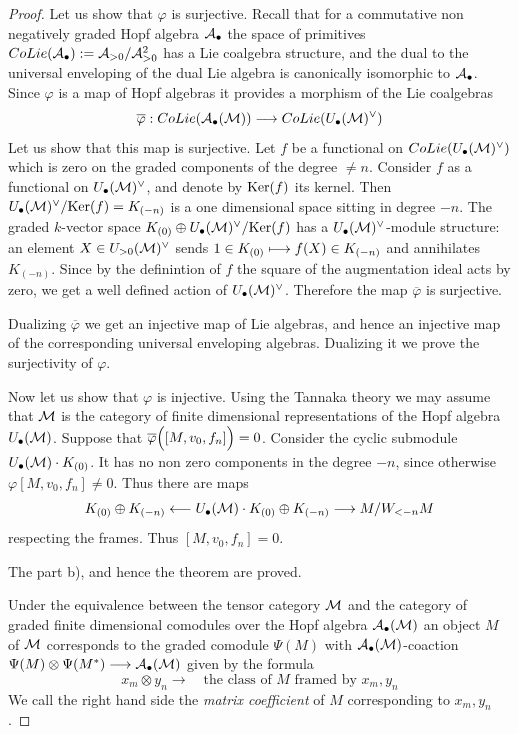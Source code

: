 \documentclass[10pt]{article}
\begin{document}
\begin{proof}
Let us show that $\varphi$ is surjective. Recall that for a commutative non negatively graded 
Hopf algebra ${\cal A}_{\bullet}$ the space of primitives 
$
{ CoLie} ({\cal A}_{\bullet}):= 
{\cal A}_{>0}/{\cal A}_{>0}^2
$ 
has a Lie coalgebra structure, and the dual to the 
universal enveloping of the dual Lie algebra is 
canonically isomorphic to  ${\cal A}_{\bullet}$. 
Since $\varphi$ is a map of Hopf algebras it provides a morphism of the Lie coalgebras 
$$
\overline \varphi: {CoLie} ({\cal A}_{\bullet}({\cal M})) \longrightarrow 
{CoLie} (U_{\bullet}({\cal M})^{\vee})
$$
Let us show that this map is surjective. 
Let $f$ be a functional on ${CoLie} (U_{\bullet}({\cal M})^{\vee})$ which is zero 
on the graded components of the degree $\not = n$. Consider $f$ as a functional 
on $U_{\bullet}({\cal M})^{\vee}$, and denote by ${\rm Ker}(f)$ its kernel. 
Then $U_{\bullet}({\cal M})^{\vee}/{\rm Ker}(f) = K_{(-n)}$ is a one dimensional 
space sitting in degree $-n$. The graded $k$-vector space 
$K_{(0)} \oplus U_{\bullet}({\cal M})^{\vee}/{\rm Ker}(f) $ has a 
$U_{\bullet}({\cal M})^{\vee}$-module structure: an element 
$X \in U_{>0}({\cal M})^{\vee}$ sends 
$1 \in K_{(0)} \longmapsto f(X) \in K_{(-n)}$ and annihilates $K_{(-n)}$. Since by the 
definintion of $f$ the square of the augmentation ideal acts by zero, 
we get a well defined action of $U_{\bullet}({\cal M})^{\vee}$. 
Therefore the map $\overline \varphi$ is surjective. 

Dualizing $\overline \varphi$ we get an injective map of 
Lie algebras, and hence an injective map of the corresponding 
universal enveloping algebras. Dualizing it we prove the surjectivity of $\varphi$. 


Now let us show that $\varphi$ is injective. Using the Tannaka theory we may assume that 
${\cal M}$ is the category of finite dimensional representations of 
the Hopf algebra $U_{\bullet}({\cal M})$. Suppose that 
$\overline \varphi\Bigl([M, v_0, f_n] \Bigr) =0$. Consider the cyclic submodule 
$U_{\bullet}({\cal M}) \cdot K_{(0)}$. It has no non zero 
components in the degree $-n$, since otherwise $\varphi[M, v_0, f_n] \not = 0$. 
Thus there are maps 
$$
K_{(0)} \oplus K_{(-n)} \longleftarrow U_{\bullet}({\cal M}) \cdot K_{(0)} \oplus K_{(-n)} \longrightarrow M / W_{<-n}M
$$
respecting the frames. Thus $[M, v_0, f_n]=0$. 

The part b), and hence the theorem are proved. 


Under the  equivalence between the  tensor category ${\cal M}$ and the category of 
graded finite dimensional comodules 
over the Hopf algebra 
${\cal  A}_{\bullet}({\cal M})$ an object $M$ of ${\cal M}$ corresponds to 
the graded comodule 
$\Psi (M)$ with 
${\cal  A}_{\bullet}({\cal M})$-coaction $\Psi (M )
\otimes \Psi (M^{\ast}) \longrightarrow {\cal  A}_{\bullet}({\cal M})$ given by the formula 
\begin{equation} \label{8-24.5/99}
x_{m} \otimes y_{n} \longrightarrow \quad \mbox{the class of $M$ 
framed by $x_{m}, y_{n}$}
\end{equation}
 We call the right hand side the {\it matrix coefficient} of $M$ corresponding to $x_{m}, y_{n}$. 



\end{proof}
\end{document}
